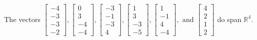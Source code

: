 \begin{exercise}
\begin{exerciseStatement}
  \end{exerciseStatement}
  \begin{exerciseAnswer}
   The vectors \(\left[\begin{array}{r}
-4 \\
-3 \\
-3 \\
-2
\end{array}\right] , \left[\begin{array}{r}
0 \\
3 \\
-4 \\
-4
\end{array}\right] , \left[\begin{array}{r}
-3 \\
-1 \\
-3 \\
4
\end{array}\right] , \left[\begin{array}{r}
1 \\
3 \\
-3 \\
-5
\end{array}\right] , \left[\begin{array}{r}
1 \\
-1 \\
4 \\
-4
\end{array}\right] , \text{ and } \left[\begin{array}{r}
4 \\
2 \\
1 \\
2
\end{array}\right]\) 
  	 do  
	span \(\mathbb{R}^4\).
  


  \end{exerciseAnswer}
\end{exercise}